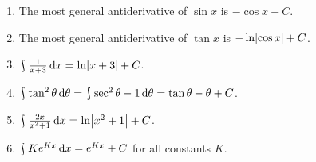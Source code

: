 \begin{exs}\leavevmode
  \begin{enumerate}
    \item The most general antiderivative of $ \sin x $ is $ -\cos x + C $.
    \item The most general antiderivative of $ \tan x $ is $ -\ln \abs{\cos x} + C $.
    \item $ \rint \frac{1}{x + 3} \dif{x} = \ln \abs{x + 3} + C $.
    \item $ \rint \tan^2 \theta \dif{\theta} = \rint \sec^2 \theta - 1 \dif{\theta} = \tan \theta - \theta + C $.
    \item $ \rint \frac{2x}{x^2 + 1} \dif{x} = \ln \abs{x^2 + 1} + C $.
    \item $ \rint Ke^{Kx} \dif{x} = e^{Kx} + C $ for all constants $ K $.
  \end{enumerate}
\end{exs}

